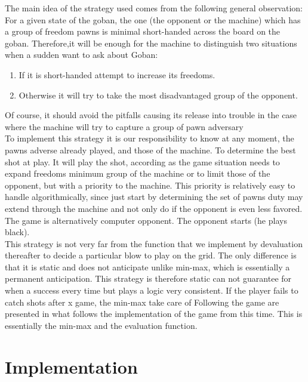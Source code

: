 \documentclass{report}
\begin{document}
The main idea of the strategy used comes from  the following general observation:
For a given state of the goban, the one (the opponent or the machine) which has a group of
freedom pawns is minimal short-handed across the board on the goban. Therefore,it will be
enough for the machine to distinguish two situations when a sudden want to ask about
Goban:\\
\begin{enumerate}
\item If it is short-handed attempt to increase its freedoms.
\item Otherwise it will try to take the most disadvantaged group of the opponent.
\end{enumerate}
Of course, it should avoid the pitfalls causing its release into trouble in the case
where the machine will try to capture a group of pawn adversary\\

To implement this strategy it is our responsibility to know at any moment, the pawns
adverse already played, and those of the machine. To determine the best shot at
play. It will play the shot, according as the game situation needs to expand freedoms
minimum group of the machine or to limit those of the opponent, but with a
priority to the machine. This priority is relatively easy to handle algorithmically, since just start by determining the set of pawns
duty may extend through the machine and not only do if the opponent
is even less favored.
The game is alternatively computer opponent. The opponent starts (he plays
black).\\

This strategy is not very far from the function that we implement by devaluation
thereafter to decide a particular blow to play on the grid. The only difference is that
it is static and does not anticipate unlike min-max, which is essentially a
permanent anticipation. This strategy is therefore static can not guarantee for
when a success every time but plays a logic very consistent.
If the player fails to catch shots after x game, the min-max take care of
Following the game are presented in what follows the implementation of the game from this
time. This is essentially the min-max and the evaluation function.\\



\chapter{Implementation}
\end{document}
